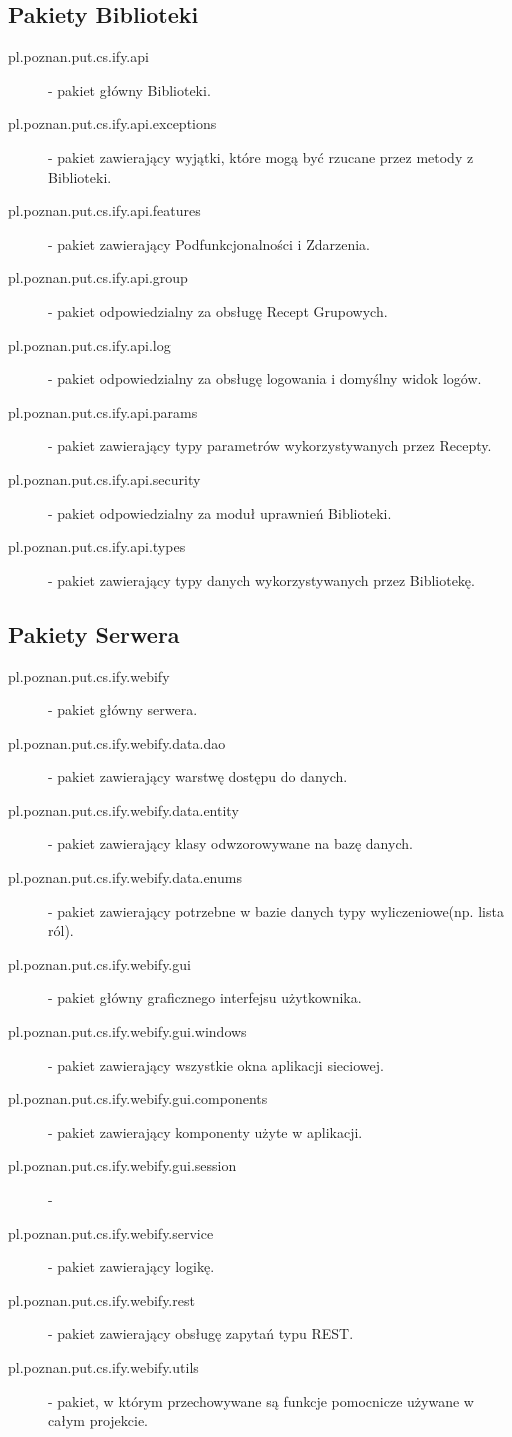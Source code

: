 \documentclass[11pt,a4paper,polish,thesis]{dcsbook}
\begin{document}
\subsection{Pakiety Biblioteki}
\begin{description}
\item[pl.poznan.put.cs.ify.api] - pakiet główny Biblioteki.
\item[pl.poznan.put.cs.ify.api.exceptions] - pakiet zawierający wyjątki, które mogą być rzucane przez metody z Biblioteki.
\item[pl.poznan.put.cs.ify.api.features] - pakiet zawierający Podfunkcjonalności i Zdarzenia.
\item[pl.poznan.put.cs.ify.api.group] - pakiet odpowiedzialny za obsługę Recept Grupowych.
\item[pl.poznan.put.cs.ify.api.log] - pakiet odpowiedzialny za obsługę logowania i domyślny widok logów.
\item[pl.poznan.put.cs.ify.api.params] - pakiet zawierający typy parametrów wykorzystywanych przez Recepty.
\item[pl.poznan.put.cs.ify.api.security] - pakiet odpowiedzialny za moduł uprawnień Biblioteki.
\item[pl.poznan.put.cs.ify.api.types] - pakiet zawierający typy danych wykorzystywanych przez Bibliotekę.
\end{description}
\subsection{Pakiety Serwera}
\begin{description}
\item[pl.poznan.put.cs.ify.webify] - pakiet główny serwera.
\item[pl.poznan.put.cs.ify.webify.data.dao] - pakiet zawierający warstwę dostępu do danych.
\item[pl.poznan.put.cs.ify.webify.data.entity] - pakiet zawierający klasy odwzorowywane na bazę danych.
\item[pl.poznan.put.cs.ify.webify.data.enums] - pakiet zawierający potrzebne w bazie danych typy wyliczeniowe(np. lista ról). 
\item[pl.poznan.put.cs.ify.webify.gui] - pakiet główny graficznego interfejsu użytkownika.
\item[pl.poznan.put.cs.ify.webify.gui.windows] - pakiet zawierający wszystkie okna aplikacji sieciowej.
\item[pl.poznan.put.cs.ify.webify.gui.components] - pakiet zawierający komponenty użyte w aplikacji.
\item[pl.poznan.put.cs.ify.webify.gui.session] - 
\item[pl.poznan.put.cs.ify.webify.service] - pakiet zawierający logikę.
\item[pl.poznan.put.cs.ify.webify.rest] - pakiet zawierający obsługę zapytań typu REST.
\item[pl.poznan.put.cs.ify.webify.utils] - pakiet, w którym przechowywane są funkcje pomocnicze używane w całym projekcie.
\end{description}
\end{document}
